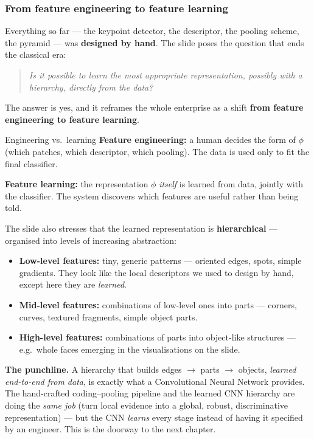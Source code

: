 \documentclass{report}
\begin{document}
\subsubsection{From feature engineering to feature learning}

Everything so far --- the keypoint detector, the descriptor, the pooling scheme,
the pyramid --- was \textbf{designed by hand}. The slide poses the question that
ends the classical era:

\begin{quote}
\emph{Is it possible to learn the most appropriate representation, possibly with
a hierarchy, directly from the data?}
\end{quote}

The answer is yes, and it reframes the whole enterprise as a shift
\textbf{from feature engineering to feature learning}.

\begin{defbox}{Engineering vs.\ learning}
\textbf{Feature engineering:} a human decides the form of $\phi$ (which
patches, which descriptor, which pooling). The data is used only to fit the
final classifier.

\medskip
\textbf{Feature learning:} the representation $\phi$ \emph{itself} is learned
from data, jointly with the classifier. The system discovers which features are
useful rather than being told.
\end{defbox}

The slide also stresses that the learned representation is \textbf{hierarchical}
--- organised into levels of increasing abstraction:
\begin{itemize}
\item \textbf{Low-level features:} tiny, generic patterns --- oriented edges,
spots, simple gradients. They look like the local descriptors we used to design
by hand, except here they are \emph{learned}.
\item \textbf{Mid-level features:} combinations of low-level ones into parts ---
corners, curves, textured fragments, simple object parts.
\item \textbf{High-level features:} combinations of parts into
object-like structures --- e.g.\ whole faces emerging in the visualisations on
the slide.
\end{itemize}

\begin{keybox}
\textbf{The punchline.} A hierarchy that builds edges $\to$ parts $\to$ objects,
\emph{learned end-to-end from data}, is exactly what a Convolutional Neural
Network provides. The hand-crafted coding--pooling pipeline and the learned CNN
hierarchy are doing the \emph{same job} (turn local evidence into a global,
robust, discriminative representation) --- but the CNN \emph{learns} every stage
instead of having it specified by an engineer. This is the doorway to the next
chapter.
\end{keybox}
\end{document}

